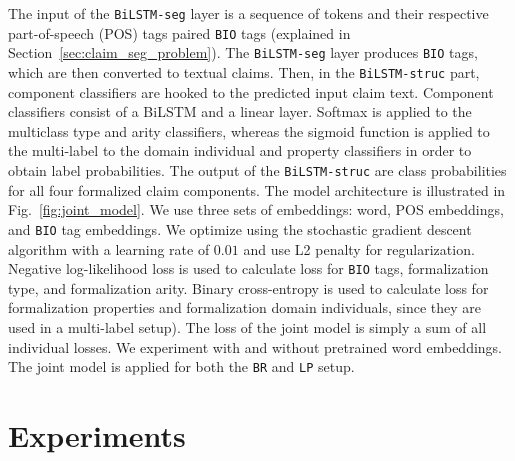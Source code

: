 The input of the \texttt{BiLSTM-seg} layer is a sequence of tokens and their
respective part-of-speech (POS) tags \citep{brown1957linguistic} paired \texttt{BIO}
tags (explained in Section~\ref{sec:claim_seg_problem}). 
The \texttt{BiLSTM-seg} layer produces \texttt{BIO} tags, which are then converted to textual
claims. Then, in the \texttt{BiLSTM-struc} part, component classifiers
are hooked to the predicted input claim text. Component classifiers
consist of a BiLSTM and a linear layer. Softmax is applied to 
the multiclass type and arity classifiers, whereas the sigmoid function is
applied to the multi-label to the domain individual and property classifiers in
order to obtain label probabilities. 
The output of the \texttt{BiLSTM-struc} are class probabilities for all four 
formalized claim components. 
The model architecture is illustrated in Fig.~\ref{fig:joint_model}. 
We use three sets of embeddings: word, POS embeddings, and \texttt{BIO} tag
embeddings. We optimize using the stochastic gradient descent algorithm
with a learning rate of $0.01$ and use L2 penalty for regularization. 
Negative log-likelihood loss is used to calculate loss for
\texttt{BIO} tags, formalization type, and formalization arity.
Binary cross-entropy is used to calculate loss for formalization
properties and formalization domain individuals, since they are used in a 
multi-label setup). 
The loss of the joint model is simply a sum of all individual losses. 
We experiment with and without pretrained word embeddings. 
The joint model is applied for both the \texttt{BR} and 
\texttt{LP} setup. 

\section{Experiments}
\label{sec:claim_struc_experiment}

